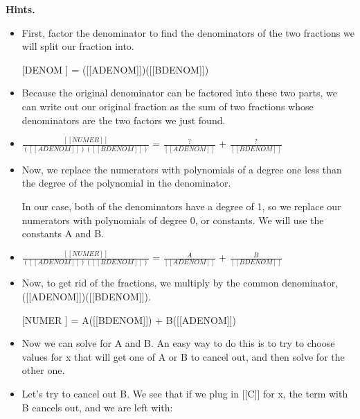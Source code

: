 \documentclass{article}
\begin{document}
\textbf{Hints.}
\begin{itemize}
  \item First, factor the denominator to find the denominators of
                    the two fractions we will split our fraction into.
  \item [[DENOM]] =
                        ([[ADENOM]])([[BDENOM]])
  \item Because the original denominator can be factored into these
                    two parts, we can write out our original fraction as the
                    sum of two fractions whose denominators are the two factors
                    we just found.
  \item $\frac{[[NUMER]]}{
                            ([[ADENOM]])([[BDENOM]])
                        }$ =
                        $\frac{?}{[[ADENOM]]}$ +
                        $\frac{?}{[[BDENOM]]}$
  \item Now, we replace the numerators with polynomials of a
                        degree one less than the degree of the polynomial in
                        the denominator.
                    
                    
                        In our case, both of the denominators have a degree of
                        1, so we replace our numerators with
                        polynomials of degree 0, or constants. We
                        will use the constants A and
                        B.
  \item $\frac{[[NUMER]]}{
                            ([[ADENOM]])([[BDENOM]])
                        }$ =
                        $\frac{A}{[[ADENOM]]}$ +
                        $\frac{B}{[[BDENOM]]}$
  \item Now, to get rid of the fractions, we multiply by the common
                    denominator,
                    ([[ADENOM]])([[BDENOM]]).
  \item [[NUMER]] =
                        A([[BDENOM]]) + B([[ADENOM]])
  \item Now we can solve for A and B. An
                    easy way to do this is to try to choose values for
                    x that will get one of A or
                    B to cancel out, and then solve for the other
                    one.
  \item Let's try to cancel out B. We see that if
                        we plug in [[C]] for
                        x, the term with B cancels
                        out, and we are left with:
                    

\end{itemize}
\end{document}
